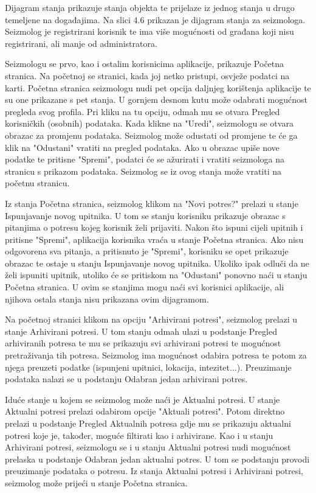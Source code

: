		Dijagram stanja prikazuje stanja objekta te prijelaze iz jednog stanja u drugo temeljene na događajima. Na slici 4.6 prikazan je dijagram stanja za seizmologa. Seizmolog je registrirani korisnik te ima više mogućnosti od građana koji nisu registrirani, ali manje od administratora. 
        
		Seizmologu se prvo, kao i ostalim korisnicima aplikacije, prikazuje Početna stranica. Na početnoj se stranici, kada joj netko pristupi, osvježe podatci na karti. Početna stranica seizmologu nudi pet opcija daljnjeg korištenja aplikacije te su one prikazane s pet stanja. 
        U gornjem desnom kutu može odabrati mogućnost pregleda svog profila. Pri kliku na tu opciju, odmah mu se otvara Pregled korisničkih (osobnih) podataka. 
        Kada klikne na "Uredi", seizmologu se otvara obrazac za promjenu podataka. Seizmolog može odustati od promjene te će ga klik na "Odustani" vratiti na pregled podataka. 
        Ako u obrazac upiše nove podatke te pritisne "Spremi", podatci će se ažurirati i vratiti seizmologa na stranicu s prikazom podataka. Seizmolog se iz ovog stanja može vratiti na početnu stranicu.
        
		Iz stanja Početna stranica, seizmolog klikom na "Novi potres?" prelazi u stanje Ispunjavanje novog upitnika. U tom se stanju korisniku prikazuje obrazac s pitanjima o potresu kojeg korisnik želi prijaviti. 
        Nakon što ispuni cijeli upitnih i pritisne "Spremi", aplikacija korisnika vraća u stanje Početna stranica. 
        Ako nisu odgovorena sva pitanja, a pritisnuto je "Spremi", korisniku se opet prikazuje obrazac te ostaje u stanju Ispunjavanje novog upitnika. Ukoliko ipak odluči da ne želi ispuniti upitnik, utoliko će se pritiskom na "Odustani" ponovno naći u stanju Početna stranica. 
        U ovim se stanjima mogu naći svi korisnici aplikacije, ali njihova ostala stanja nisu prikazana ovim dijagramom. 
        
		Na početnoj stranici klikom na opciju "Arhivirani potresi", seizmolog prelazi u stanje Arhivirani potresi. U tom stanju odmah ulazi u podstanje Pregled arhiviranih potresa te mu se prikazuju svi arhivirani potresi te mogućnost pretraživanja tih potresa. 
        Seizmolog ima mogućnost odabira potresa te potom za njega preuzeti podatke (ispunjeni upitnici, lokacija, intezitet...). Preuzimanje podataka nalazi se u podstanju Odabran jedan arhivirani potres. 
        
		Iduće stanje u kojem se seizmolog može naći je Aktualni potresi. U stanje Aktualni potresi prelazi odabirom opcije "Aktuali potresi". 
        Potom direktno prelazi u podstanje Pregled Aktualnih potresa gdje mu se prikazuju aktualni potresi koje je, također, moguće filtirati kao i arhivirane. Kao i u stanju Arhivirani potresi, seizmologu se i u stanju Aktualni potresi nudi mogućnost 
        prelaska u podstanje Odabran jedan aktualni potres. U tom se podstanju provodi preuzimanje podataka o potresu. Iz stanja Aktualni potresi i Arhivirani potresi, seizmolog može prijeći u stanje Početna stranica.
       
